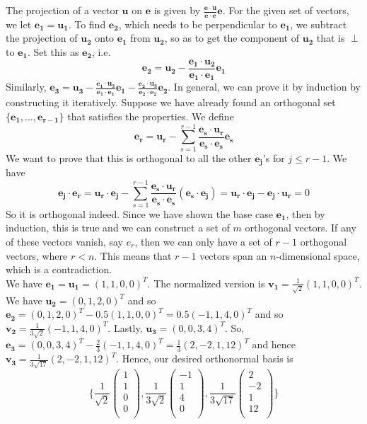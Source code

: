 \documentclass[a4paper]{article}
\begin{document}
\begin{ans}
The projection of a vector $\mathbf{u}$ on $\mathbf{e}$ is given by $\frac{\mathbf{e}\cdot\mathbf{u}}{\mathbf{e}\cdot\mathbf{e}}\mathbf{e}$. For the given set of vectors, we let $\mathbf{e_1}=\mathbf{u_1}$. To find $\mathbf{e_2}$, which needs to be perpendicular to $\mathbf{e_1}$, we subtract the projection of $\mathbf{u_2}$ onto $\mathbf{e_1}$ from $\mathbf{u_2}$, so as to get the component of $\mathbf{u_2}$ that is $\perp$ to $\mathbf{e_1}$. Set this as $\mathbf{e_2}$, i.e.
$$\mathbf{e_2}=\mathbf{u_2}-\frac{\mathbf{e_1}\cdot\mathbf{u_2}}{\mathbf{e_1}\cdot\mathbf{e_1}}\mathbf{e_1}$$
Similarly, $\mathbf{e_3}=\mathbf{u_3}-\frac{\mathbf{e_1}\cdot\mathbf{u_3}}{\mathbf{e_1}\cdot\mathbf{e_1}}\mathbf{e_1}-\frac{\mathbf{e_2}\cdot\mathbf{u_3}}{\mathbf{e_2}\cdot\mathbf{e_2}}\mathbf{e_2}$. In general, we can prove it by induction by constructing it iteratively. Suppose we have already found an orthogonal set $\{\mathbf{e_1},..., \mathbf{e_{r-1}}\}$ that satisfies the properties. We define 
$$\mathbf{e_r}=\mathbf{u_r}-\sum_{s=1}^{r-1}\frac{\mathbf{e_s}\cdot\mathbf{u_r}}{\mathbf{e_s}\cdot\mathbf{e_s}}\mathbf{e_s}$$
We want to prove that this is orthogonal to all the other $\mathbf{e_j}$’s for $j\leq r-1$. We have
$$\mathbf{e_j}\cdot\mathbf{e_r}=\mathbf{u_r}\cdot\mathbf{e_j}-\sum_{s=1}^{r-1}\frac{\mathbf{e_s}\cdot\mathbf{u_r}}{\mathbf{e_s}\cdot\mathbf{e_s}}(\mathbf{e_s}\cdot\mathbf{e_j})=\mathbf{u_r}\cdot\mathbf{e_j}-\mathbf{e_j}\cdot\mathbf{u_r}=0$$
So it is orthogonal indeed. Since we have shown the base case $\mathbf{e_1}$, then by induction, this is true and we can construct a set of $m$ orthogonal vectors. If any of these vectors vanish, say $e_r$, then we can only have a set of $r-1$ orthogonal vectors, where $r<n$. This means that $r-1$ vectors span an $n$-dimensional space, which is a contradiction.\\[5pt]
We have $\mathbf{e_1}=\mathbf{u_1}=(1,1,0,0)^T$. The normalized version is $\mathbf{v_1}=\frac{1}{\sqrt{2}}(1,1,0,0)^T$. We have $\mathbf{u_2}=(0,1,2,0)^T$ and so $\mathbf{e_2}=(0,1,2,0)^T-0.5(1,1,0,0)^T=0.5(-1,1,4,0)^T$ and so $\mathbf{v_2}=\frac{1}{3\sqrt{2}}(-1,1,4,0)^T$. Lastly, $\mathbf{u_3}=(0,0,3,4)^T$. So, $\mathbf{e_3}=(0,0,3,4)^T-\frac{2}{3}(-1,1,4,0)^T=\frac{1}{3}(2,-2,1,12)^T$ and hence $\mathbf{v_3}=\frac{1}{3\sqrt{17}}(2,-2,1,12)^T$. Hence, our desired orthonormal basis is
$$\bigg\{\frac{1}{\sqrt{2}}\begin{pmatrix}1\\1\\0\\0\\\end{pmatrix},\frac{1}{3\sqrt{2}}\begin{pmatrix}-1\\1\\4\\0\\\end{pmatrix},\frac{1}{3\sqrt{17}}\begin{pmatrix}2\\-2\\1\\12\\\end{pmatrix}\bigg\}$$
\end{ans}
\end{document}
